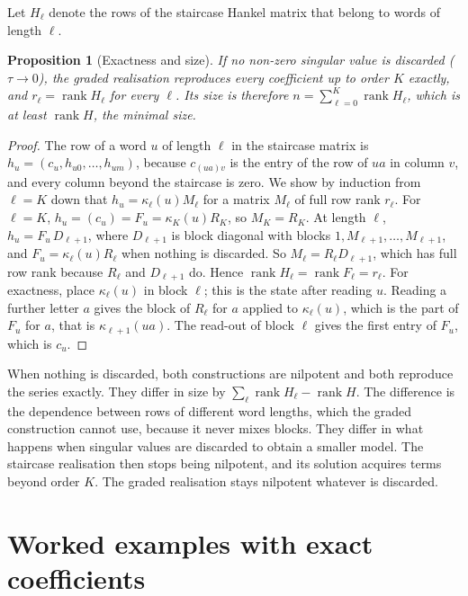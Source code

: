 \documentclass[11pt,a4paper]{article}
\newtheorem{proposition}{Proposition}
\theoremstyle{remark}
\begin{document}
Let $H_\ell$ denote the rows of the staircase Hankel matrix that belong to words of length $\ell$.

\begin{proposition}[Exactness and size]\label{prop:size}
If no non-zero singular value is discarded ($\tau\to0$), the graded realisation reproduces every coefficient up to order $K$ exactly, and $r_\ell=\operatorname{rank}H_\ell$ for every $\ell$.
Its size is therefore $n=\sum_{\ell=0}^K\operatorname{rank}H_\ell$, which is at least $\operatorname{rank}H$, the minimal size.
\end{proposition}
\begin{proof}
The row of a word $u$ of length $\ell$ in the staircase matrix is $h_u=(c_u,h_{u0},\dots,h_{um})$, because $c_{(ua)v}$ is the entry of the row of $ua$ in column $v$, and every column beyond the staircase is zero.
We show by induction from $\ell=K$ down that $h_u=\kappa_\ell(u)M_\ell$ for a matrix $M_\ell$ of full row rank $r_\ell$.
For $\ell=K$, $h_u=(c_u)=F_u=\kappa_K(u)R_K$, so $M_K=R_K$.
At length $\ell$, $h_u=F_u\,D_{\ell+1}$, where $D_{\ell+1}$ is block diagonal with blocks $1,M_{\ell+1},\dots,M_{\ell+1}$, and $F_u=\kappa_\ell(u)R_\ell$ when nothing is discarded.
So $M_\ell=R_\ell D_{\ell+1}$, which has full row rank because $R_\ell$ and $D_{\ell+1}$ do.
Hence $\operatorname{rank}H_\ell=\operatorname{rank}F_\ell=r_\ell$.
For exactness, place $\kappa_\ell(u)$ in block $\ell$; this is the state after reading $u$.
Reading a further letter $a$ gives the block of $R_\ell$ for $a$ applied to $\kappa_\ell(u)$, which is the part of $F_u$ for $a$, that is $\kappa_{\ell+1}(ua)$.
The read-out of block $\ell$ gives the first entry of $F_u$, which is $c_u$.
\end{proof}

When nothing is discarded, both constructions are nilpotent and both reproduce the series exactly.
They differ in size by $\sum_\ell\operatorname{rank}H_\ell-\operatorname{rank}H$.
The difference is the dependence between rows of different word lengths, which the graded construction cannot use, because it never mixes blocks.
They differ in what happens when singular values are discarded to obtain a smaller model.
The staircase realisation then stops being nilpotent, and its solution acquires terms beyond order $K$.
The graded realisation stays nilpotent whatever is discarded.

\section{Worked examples with exact coefficients}\label{sec:validation}
\end{document}
